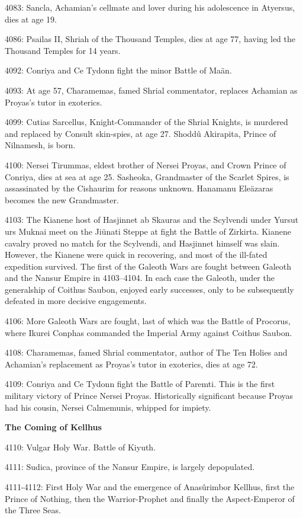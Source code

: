 \documentclass[]{book}
\begin{document}
4083: Sancla, Achamian's cellmate and lover during his adolescence in Atyersus, dies
at age 19.

4086: Psailas II, Shriah of the Thousand Temples, dies at age 77, having led the
Thousand Temples for 14 years.

4092: Conriya and Ce Tydonn fight the minor Battle of Maän.

4093: At age 57, Charamemas, famed Shrial commentator, replaces Achamian as
Proyas's tutor in exoterics.

4099: Cutias Sarcellus, Knight-Commander of the Shrial Knights, is murdered and
replaced by Consult skin-spies, at age 27. Shoddû Akirapita, Prince of Nilnamesh, is born.

4100: Nersei Tirummas, eldest brother of Nersei Proyas, and Crown Prince of
Conriya, dies at sea at age 25. Sasheoka, Grandmaster of the Scarlet Spires, is
assassinated by the Cishaurim for reasons unknown. Hanamanu Eleäzaras becomes the new Grandmaster.

4103: The Kianene host of Hasjinnet ab Skauras and the Scylvendi under Yursut urs
Muknai meet on the Jiünati Steppe at fight the Battle of Zirkirta. Kianene
cavalry proved no match for the Scylvendi, and Hasjinnet himself was slain.
However, the Kianene were quick in recovering, and most of the ill-fated
expedition survived. The first of the Galeoth Wars are fought between Galeoth
and the Nansur Empire in 4103--4104. In each case the Galeoth, under the
generalship of Coithus Saubon, enjoyed early successes, only to be subsequently
defeated in more decisive engagements.

4106: More Galeoth Wars are fought, last of which was the Battle of Procorus,
where Ikurei Conphas commanded the Imperial Army against Coithus Saubon.

4108: Charamemas, famed Shrial commentator, author of The Ten Holies and
Achamian's replacement as Proyas's tutor in exoterics, dies at age 72.

4109: Conriya and Ce Tydonn fight the Battle of Paremti. This is the first military
victory of Prince Nersei Proyas. Historically significant because Proyas had his
cousin, Nersei Calmemunis, whipped for impiety.

\textbf{The Coming of Kellhus}

4110: Vulgar Holy War. Battle of Kiyuth.

4111: Sudica, province of the Nansur Empire, is largely depopulated.

4111-4112: First Holy War and the emergence of Anasûrimbor Kellhus, first the
Prince of Nothing, then the Warrior-Prophet and finally the Aspect-Emperor of
the Three Seas.
\end{document}
